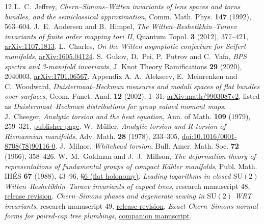 \documentclass[11pt]{article}
\newcommand{\SU}{\mathrm{SU}(2)}
\begin{document}





\begin{thebibliography}{12}
\setlength{\itemsep}{2pt}
 L.~C.~Jeffrey, \emph{Chern--Simons--Witten invariants of lens spaces and torus bundles, and the semiclassical approximation}, Comm. Math. Phys. \textbf{147} (1992), 563--604.
 J.~E.~Andersen and B.~Himpel, \emph{The Witten--Reshetikhin--Turaev invariants of finite order mapping tori II}, Quantum Topol. \textbf{3} (2012), 377--421, \href{https://arxiv.org/abs/1107.1813}{arXiv:1107.1813}.
 L.~Charles, \emph{On the Witten asymptotic conjecture for Seifert manifolds}, \href{https://arxiv.org/abs/1605.04124}{arXiv:1605.04124}.
 S.~Gukov, D.~Pei, P.~Putrov and C.~Vafa, \emph{BPS spectra and 3-manifold invariants}, J. Knot Theory Ramifications \textbf{29} (2020), 2040003, \href{https://arxiv.org/abs/1701.06567}{arXiv:1701.06567}, Appendix A.
 A.~Alekseev, E.~Meinrenken and C.~Woodward, \emph{Duistermaat--Heckman measures and moduli spaces of flat bundles over surfaces}, Geom. Funct. Anal. \textbf{12} (2002), 1--31; \href{https://arxiv.org/abs/math/9903087v2}{arXiv:math/9903087v2}, listed as \emph{Duistermaat--Heckman distributions for group valued moment maps}.
 J.~Cheeger, \emph{Analytic torsion and the heat equation}, Ann. of Math. \textbf{109} (1979), 259--321, \href{https://annals.math.princeton.edu/1979/109-2/p02}{publisher page}.
 W.~M\"uller, \emph{Analytic torsion and R-torsion of Riemannian manifolds}, Adv. Math. \textbf{28} (1978), 233--305, \href{https://doi.org/10.1016/0001-8708(78)90116-0}{doi:10.1016/0001-8708(78)90116-0}.
 J.~Milnor, \emph{Whitehead torsion}, Bull. Amer. Math. Soc. \textbf{72} (1966), 358--426.
 W.~M.~Goldman and J.~J.~Millson, \emph{The deformation theory of representations of fundamental groups of compact K\"ahler manifolds}, Publ. Math. IH\'ES \textbf{67} (1988), 43--96, \href{https://numdam.org/item/PMIHES_1988__67__43_0/}{\S6 (flat holonomy)}.
 \emph{Leading logarithms in closed \(\SU\) Witten--Reshetikhin--Turaev invariants of capped trees}, research manuscript 48, \href{https://github.com/g3173028019-beep/ai-automated-quantum-gravity-research/tree/d23f0b109029d37a09a1b8758dd73f1e27a7ef72/papers/48-wrt-leading-logarithms}{release revision}.
 \emph{Chern--Simons phases and degenerate sewing in \(\SU\) WRT invariants}, research manuscript 49, \href{https://github.com/g3173028019-beep/ai-automated-quantum-gravity-research/tree/d23f0b109029d37a09a1b8758dd73f1e27a7ef72/papers/49-wrt-semiclassical-sewing}{release revision}.
 \emph{Exact Chern--Simons normal forms for paired-cap tree plumbings}, \href{https://github.com/g3173028019-beep/ai-automated-quantum-gravity-research/tree/main/papers/49b-cs-normal-forms}{companion manuscript}.
\end{thebibliography}
\end{document}
